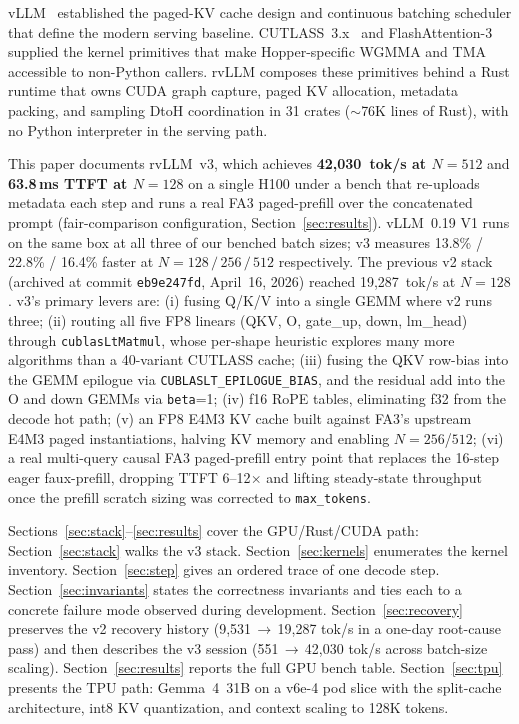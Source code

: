 vLLM~\cite{kwon2023vllm} established the paged-KV cache design and
continuous batching scheduler that define the modern serving baseline.
CUTLASS~3.x~\cite{cutlass2024} and FlashAttention-3~\cite{shah2024flash3}
supplied the kernel primitives that make Hopper-specific WGMMA and TMA
accessible to non-Python callers. rvLLM composes these primitives behind
a Rust runtime that owns CUDA graph capture, paged KV allocation,
metadata packing, and sampling DtoH coordination in 31 crates
($\sim$76K lines of Rust), with no Python interpreter in the serving
path.

This paper documents rvLLM~v3, which achieves
\textbf{42{,}030~tok/s at $N\!=\!512$} and \textbf{63.8\,ms TTFT at $N\!=\!128$}
on a single H100 under a bench that re-uploads metadata each step and
runs a real FA3 paged-prefill over the concatenated prompt
(fair-comparison configuration, Section~\ref{sec:results}). vLLM~0.19
V1 runs on the same box at all three of our benched batch sizes; v3
measures 13.8\% / 22.8\% / 16.4\% faster at $N\!=\!128\,/\,256\,/\,512$
respectively. The previous v2 stack (archived at commit
\texttt{eb9e247fd}, April~16, 2026) reached 19{,}287~tok/s at $N\!=\!128$.
v3's primary levers are: (i)
fusing Q/K/V into a single GEMM where v2 runs three; (ii) routing all five
FP8 linears (QKV, O, gate\_up, down, lm\_head) through
\texttt{cublasLtMatmul}, whose per-shape heuristic explores many more
algorithms than a 40-variant CUTLASS cache; (iii) fusing the QKV row-bias
into the GEMM epilogue via \texttt{CUBLASLT\_EPILOGUE\_BIAS}, and the
residual add into the O and down GEMMs via \texttt{beta}=1; (iv) f16 RoPE
tables, eliminating f32 from the decode hot path; (v) an FP8 E4M3 KV cache
built against FA3's upstream E4M3 paged instantiations, halving KV memory
and enabling $N\!=\!256$/$512$; (vi) a real multi-query causal FA3 paged-prefill
entry point that replaces the 16-step eager faux-prefill, dropping TTFT
6--12$\times$ and lifting steady-state throughput once the prefill scratch
sizing was corrected to \texttt{max\_tokens}.

Sections~\ref{sec:stack}--\ref{sec:results} cover the GPU/Rust/CUDA
path: Section~\ref{sec:stack} walks the v3 stack.
Section~\ref{sec:kernels} enumerates the kernel inventory.
Section~\ref{sec:step} gives an ordered trace of one decode step.
Section~\ref{sec:invariants} states the correctness invariants and ties
each to a concrete failure mode observed during development.
Section~\ref{sec:recovery} preserves the v2 recovery history
(9{,}531\,\ensuremath{\rightarrow}\,19{,}287 tok/s in a one-day root-cause pass) and then
describes the v3 session (551\,\ensuremath{\rightarrow}\,42{,}030 tok/s across batch-size scaling).
Section~\ref{sec:results} reports the full GPU bench table.
Section~\ref{sec:tpu} presents the TPU path: Gemma~4~31B on a
v6e-4 pod slice with the split-cache architecture, int8 KV
quantization, and context scaling to 128K tokens.


